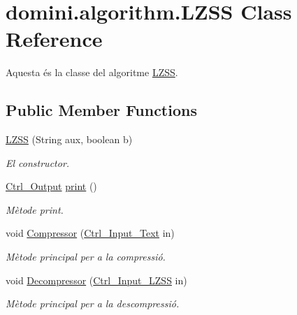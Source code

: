 \hypertarget{classdomini_1_1algorithm_1_1LZSS}{}\section{domini.\+algorithm.\+L\+Z\+SS Class Reference}
\label{classdomini_1_1algorithm_1_1LZSS}


Aquesta és la classe del algoritme \hyperlink{classdomini_1_1algorithm_1_1LZSS}{L\+Z\+SS}.  


\subsection*{Public Member Functions}
\begin{DoxyCompactItemize}
\item 
\hyperlink{classdomini_1_1algorithm_1_1LZSS_a991f29ccc89ecbb5645ea8f123205e20}{L\+Z\+SS} (String aux, boolean b)
\begin{DoxyCompactList}\small\item\em El constructor. \end{DoxyCompactList}\item 
\hyperlink{classpersistencia_1_1output_1_1Ctrl__Output}{Ctrl\+\_\+\+Output} \hyperlink{classdomini_1_1algorithm_1_1LZSS_a8172ff7c8aefb87c90c648bc1b6b78b9}{print} ()
\begin{DoxyCompactList}\small\item\em Mètode print. \end{DoxyCompactList}\item 
void \hyperlink{classdomini_1_1algorithm_1_1LZSS_a385d06ea406b7a0f1168370e9574531a}{Compressor} (\hyperlink{classpersistencia_1_1input_1_1Ctrl__Input__Text}{Ctrl\+\_\+\+Input\+\_\+\+Text} in)
\begin{DoxyCompactList}\small\item\em Mètode principal per a la compressió. \end{DoxyCompactList}\item 
void \hyperlink{classdomini_1_1algorithm_1_1LZSS_a3fcf941d4301a4a857c585b3770a0ecf}{Decompressor} (\hyperlink{classpersistencia_1_1input_1_1Ctrl__Input__LZSS}{Ctrl\+\_\+\+Input\+\_\+\+L\+Z\+SS} in)
\begin{DoxyCompactList}\small\item\em Mètode principal per a la descompressió. \end{DoxyCompactList}\end{DoxyCompactItemize}


